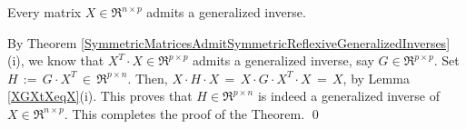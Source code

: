 \begin{theorem}
\mbox{}\vskip 0.1cm\noindent
Every matrix $X \in \Re^{n \times p}$ admits a generalized inverse.
\end{theorem}
\proof
By Theorem \ref{SymmetricMatricesAdmitSymmetricReflexiveGeneralizedInverses}(i),
we know that $X^{T} \cdot X \in \Re^{p \times p}$ admits a generalized inverse, say $G \in \Re^{p \times p}$.
Set $H \,:=\, G \cdot X^{T} \,\in\, \Re^{p \times n}$.
Then, $X \cdot H \cdot X \,=\, X \cdot G \cdot X^{T} \cdot X \,=\, X$, by Lemma \ref{XGXtXeqX}(i).
This proves that $H \in \Re^{p \times n}$ is indeed a generalized inverse of $X \in \Re^{n \times p}$.
This completes the proof of the Theorem.
\qed

